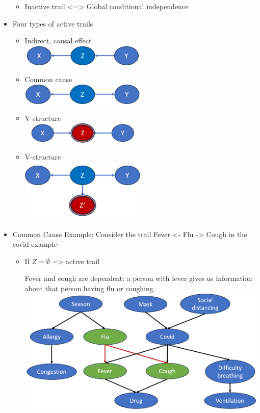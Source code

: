 \documentclass[11pt,a4paper]{report}
\begin{document}
\begin{itemize}
\begin{itemize}
        \item Inactive trail <=> Global conditional independence
    \end{itemize}
    \item Four types of active trails
    \begin{itemize}
        \item Indirect, causal effect\\
        \includegraphics[width = 6cm, height = 1cm]{active_t1.png}
        \item Common cause\\
        \includegraphics[width = 6cm, height = 1cm]{active_t2.png}
        \item V-structure\\
        \includegraphics[width = 6cm, height = 1cm]{active_t3.png}
        \item V-structure\\
        \includegraphics[width = 6cm, height = 3cm]{active_t4.png}
    \end{itemize}
    \item Common Cause Example: Consider the trail Fever <- Flu -> Cough in the covid example
    \begin{itemize}
        \item If $Z = \emptyset$ => active trail
        \begin{center}
        Fever and cough are dependent: a person with fever gives us information about that person having flu or coughing.
        \vspace{0.5cm}
        \includegraphics[width = 13cm, height = 6cm]{active_covid.png}

\end{center}
\end{itemize}
\end{itemize}
\end{document}
